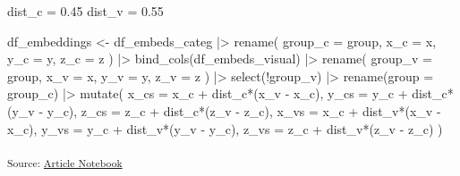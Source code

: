 \documentclass[
  authoryear]{elsarticle}
\newenvironment{Shaded}{\begin{snugshade}}{\end{snugshade}}
\newcommand{\AttributeTok}[1]{\textcolor[rgb]{0.40,0.45,0.13}{#1}}
\newcommand{\FloatTok}[1]{\textcolor[rgb]{0.68,0.00,0.00}{#1}}
\newcommand{\FunctionTok}[1]{\textcolor[rgb]{0.28,0.35,0.67}{#1}}
\newcommand{\NormalTok}[1]{\textcolor[rgb]{0.00,0.23,0.31}{#1}}
\newcommand{\OtherTok}[1]{\textcolor[rgb]{0.00,0.23,0.31}{#1}}
\newcommand{\SpecialCharTok}[1]{\textcolor[rgb]{0.37,0.37,0.37}{#1}}
\begin{document}
\begin{Shaded}
\begin{Highlighting}[]
\NormalTok{dist\_c }\OtherTok{=} \FloatTok{0.45}
\NormalTok{dist\_v }\OtherTok{=} \FloatTok{0.55}

\NormalTok{df\_embeddings }\OtherTok{\textless{}{-}}
\NormalTok{  df\_embeds\_categ }\SpecialCharTok{|\textgreater{}}
  \FunctionTok{rename}\NormalTok{(}
    \AttributeTok{group\_c =}\NormalTok{ group,}
    \AttributeTok{x\_c =}\NormalTok{ x,}
    \AttributeTok{y\_c =}\NormalTok{ y,}
    \AttributeTok{z\_c =}\NormalTok{ z}
\NormalTok{  ) }\SpecialCharTok{|\textgreater{}}
  \FunctionTok{bind\_cols}\NormalTok{(df\_embeds\_visual) }\SpecialCharTok{|\textgreater{}}
  \FunctionTok{rename}\NormalTok{(}
    \AttributeTok{group\_v =}\NormalTok{ group,}
    \AttributeTok{x\_v =}\NormalTok{ x,}
    \AttributeTok{y\_v =}\NormalTok{ y,}
    \AttributeTok{z\_v =}\NormalTok{ z}
\NormalTok{  ) }\SpecialCharTok{|\textgreater{}} 
  \FunctionTok{select}\NormalTok{(}\SpecialCharTok{!}\NormalTok{group\_v) }\SpecialCharTok{|\textgreater{}} 
  \FunctionTok{rename}\NormalTok{(}\AttributeTok{group =}\NormalTok{ group\_c) }\SpecialCharTok{|\textgreater{}} 
  \FunctionTok{mutate}\NormalTok{(}
    \AttributeTok{x\_cs =}\NormalTok{ x\_c }\SpecialCharTok{+}\NormalTok{ dist\_c}\SpecialCharTok{*}\NormalTok{(x\_v }\SpecialCharTok{{-}}\NormalTok{ x\_c),}
    \AttributeTok{y\_cs =}\NormalTok{ y\_c }\SpecialCharTok{+}\NormalTok{ dist\_c}\SpecialCharTok{*}\NormalTok{(y\_v }\SpecialCharTok{{-}}\NormalTok{ y\_c),}
    \AttributeTok{z\_cs =}\NormalTok{ z\_c }\SpecialCharTok{+}\NormalTok{ dist\_c}\SpecialCharTok{*}\NormalTok{(z\_v }\SpecialCharTok{{-}}\NormalTok{ z\_c),}
    \AttributeTok{x\_vs =}\NormalTok{ x\_c }\SpecialCharTok{+}\NormalTok{ dist\_v}\SpecialCharTok{*}\NormalTok{(x\_v }\SpecialCharTok{{-}}\NormalTok{ x\_c),}
    \AttributeTok{y\_vs =}\NormalTok{ y\_c }\SpecialCharTok{+}\NormalTok{ dist\_v}\SpecialCharTok{*}\NormalTok{(y\_v }\SpecialCharTok{{-}}\NormalTok{ y\_c),}
    \AttributeTok{z\_vs =}\NormalTok{ z\_c }\SpecialCharTok{+}\NormalTok{ dist\_v}\SpecialCharTok{*}\NormalTok{(z\_v }\SpecialCharTok{{-}}\NormalTok{ z\_c)}
\NormalTok{  )}
\end{Highlighting}
\end{Shaded}

\textsubscript{Source:
\href{https://m-delem.github.io/2499-similarity-manuscript/index.qmd.html}{Article
Notebook}}
\end{document}
